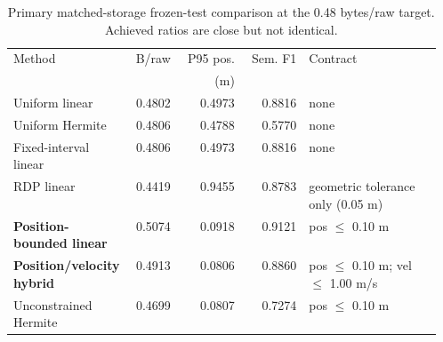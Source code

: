 \begin{table}[t]
\centering
\caption{Primary matched-storage frozen-test comparison at the 0.48 bytes/raw target. Achieved ratios are close but not identical.}
\label{tab:primary-matched-byte-compact}
\small
\setlength{\tabcolsep}{2.5pt}
\begin{tabular}{@{}p{0.25\linewidth}rrrp{0.31\linewidth}@{}}
\toprule
Method & B/raw & P95 pos. & Sem. F1 & Contract \\
 &  & (m) &  &  \\
\midrule
Uniform linear & 0.4802 & 0.4973 & 0.8816 & none \\
Uniform Hermite & 0.4806 & 0.4788 & 0.5770 & none \\
Fixed-interval linear & 0.4806 & 0.4973 & 0.8816 & none \\
RDP linear & 0.4419 & 0.9455 & 0.8783 & geometric tolerance only (0.05 m) \\
\addlinespace[2pt]
\textbf{Position-bounded linear} & 0.5074 & 0.0918 & 0.9121 & pos $\leq$ 0.10 m \\
\textbf{Position/velocity hybrid} & 0.4913 & 0.0806 & 0.8860 & pos $\leq$ 0.10 m; vel $\leq$ 1.00 m/s \\
\addlinespace[2pt]
Unconstrained Hermite & 0.4699 & 0.0807 & 0.7274 & pos $\leq$ 0.10 m \\
\bottomrule
\end{tabular}
\end{table}
